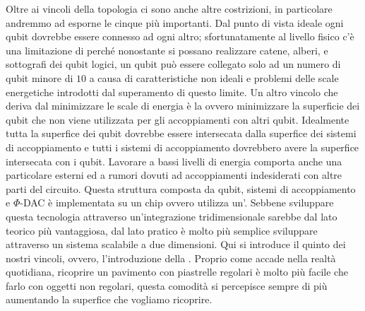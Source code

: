 Oltre ai vincoli della topologia ci sono anche altre costrizioni, in particolare andremmo ad esporne le cinque più importanti. Dal punto di vista ideale ogni qubit dovrebbe essere connesso ad ogni altro; sfortunatamente al livello fisico c'è una limitazione di  perché nonostante si possano realizzare catene, alberi, e sottografi dei qubit logici, un qubit può essere collegato solo ad un numero di qubit minore di $10$ a causa di caratteristiche non ideali e problemi delle scale energetiche introdotti dal superamento di questo limite. Un altro vincolo che deriva dal minimizzare le scale di energia è la  ovvero minimizzare la superficie dei qubit che non viene utilizzata per gli accoppiamenti con altri qubit. Idealmente tutta la superfice dei qubit dovrebbe essere intersecata dalla superfice dei sistemi di accoppiamento e tutti i sistemi di accoppiamento dovrebbero avere la superfice intersecata con i qubit. Lavorare a bassi livelli di energia comporta anche una particolare  esterni ed a rumori dovuti ad accoppiamenti indesiderati con altre parti del circuito. Questa struttura composta da qubit, sistemi di accoppiamento e $\Phi$-DAC è implementata su un chip ovvero utilizza un'. Sebbene sviluppare questa tecnologia attraverso un'integrazione tridimensionale sarebbe dal lato teorico più vantaggiosa, dal lato pratico è molto più semplice sviluppare attraverso un sistema scalabile a due dimensioni. Qui si introduce il quinto dei nostri vincoli, ovvero, l'introduzione della . Proprio come accade nella realtà quotidiana, ricoprire un pavimento con piastrelle regolari è molto più facile che farlo con oggetti non regolari, questa comodità si percepisce sempre di più aumentando la superfice che vogliamo ricoprire.

